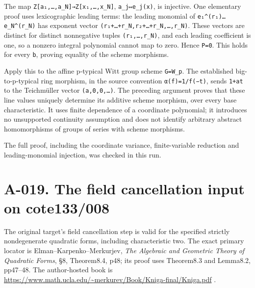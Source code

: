 \documentclass[
  10pt,
]{article}
\begin{document}
The map
\texttt{\small Z[\allowbreak{}a₁,\allowbreak{}…,\allowbreak{}a\_\allowbreak{}N]\allowbreak{}→\allowbreak{}Z[\allowbreak{}x₁,\allowbreak{}…,\allowbreak{}x\_\allowbreak{}N]\allowbreak{}},
\texttt{\small a\_\allowbreak{}j↦e\_\allowbreak{}j(\allowbreak{}x)\allowbreak{}},
is injective. One elementary proof uses lexicographic leading terms: the
leading monomial of
\texttt{\small e₁\textasciicircum{}(\allowbreak{}r₁)\allowbreak{}…e\_\allowbreak{}N\textasciicircum{}(\allowbreak{}r\_\allowbreak{}N)\allowbreak{}}
has exponent vector
\texttt{\small (\allowbreak{}r₁+\allowbreak{}…+\allowbreak{}r\_\allowbreak{}N,\allowbreak{}r₂+\allowbreak{}…+\allowbreak{}r\_\allowbreak{}N,\allowbreak{}…,\allowbreak{}r\_\allowbreak{}N)\allowbreak{}}.
These vectors are distinct for distinct nonnegative tuples
\texttt{\small (\allowbreak{}r₁,\allowbreak{}…,\allowbreak{}r\_\allowbreak{}N)\allowbreak{}},
and each leading coefficient is one, so a nonzero integral polynomial
cannot map to zero. Hence \texttt{\small P=\allowbreak{}0}. This holds
for every \texttt{\small b}, proving equality of the scheme morphisms.

Apply this to the affine p-typical Witt group scheme
\texttt{\small G=\allowbreak{}W\_\allowbreak{}p}. The established
big-to-p-typical ring morphism, in the source convention
\texttt{\small α(\allowbreak{}f)\allowbreak{}=\allowbreak{}1/\allowbreak{}f(\allowbreak{}−t)\allowbreak{}},
sends \texttt{\small 1+\allowbreak{}at} to the Teichmüller vector
\texttt{\small (\allowbreak{}a,\allowbreak{}0,\allowbreak{}0,\allowbreak{}…)\allowbreak{}}.
The preceding argument proves that these line values uniquely determine
its additive scheme morphism, over every base characteristic. It uses
finite dependence of a coordinate polynomial; it introduces no
unsupported continuity assumption and does not identify arbitrary
abstract homomorphisms of groups of series with scheme morphisms.

The full proof, including the coordinate variance, finite-variable
reduction and leading-monomial injection, was checked in this run.

\section{A-019. The field cancellation input on
cote133/008}\label{a-019.-the-field-cancellation-input-on-cote133008}

The original target's field cancellation step is valid for the specified
strictly nondegenerate quadratic forms, including characteristic two.
The exact primary locator is Elman--Karpenko--Merkurjev, \emph{The
Algebraic and Geometric Theory of Quadratic Forms}, §8, Theorem8.4, p48;
its proof uses Theorem8.3 and Lemma8.2, pp47--48. The author-hosted book
is \url{https://www.math.ucla.edu/~merkurev/Book/Kniga-final/Kniga.pdf}
.
\end{document}
